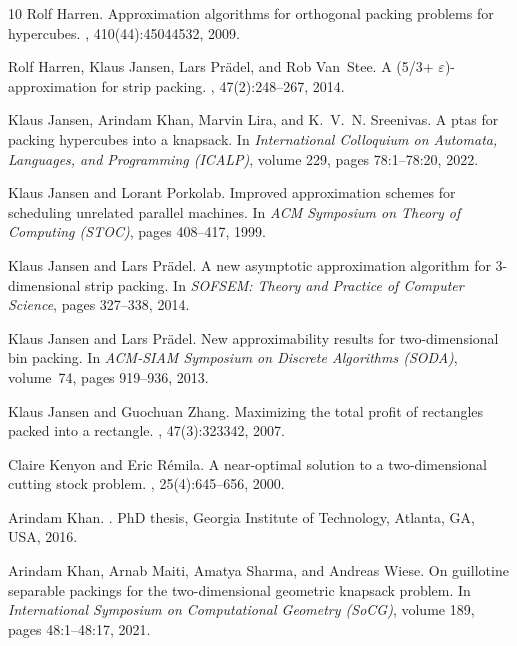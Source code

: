 \begin{thebibliography}{10}
Rolf Harren.
\newblock Approximation algorithms for orthogonal packing problems for
  hypercubes.
, 410(44):4504\textendash{}4532, 2009.

Rolf Harren, Klaus Jansen, Lars Pr{\"a}del, and Rob Van~Stee.
\newblock A (5/3+ $\varepsilon$)-approximation for strip packing.
, 47(2):248--267, 2014.

Klaus Jansen, Arindam Khan, Marvin Lira, and K.~V.~N. Sreenivas.
\newblock A ptas for packing hypercubes into a knapsack.
\newblock In {\em International Colloquium on Automata, Languages, and
  Programming (ICALP)}, volume 229, pages 78:1--78:20, 2022.

Klaus Jansen and Lorant Porkolab.
\newblock Improved approximation schemes for scheduling unrelated parallel
  machines.
\newblock In {\em ACM Symposium on Theory of Computing (STOC)}, pages 408--417,
  1999.

Klaus Jansen and Lars Pr{\"a}del.
\newblock A new asymptotic approximation algorithm for 3-dimensional strip
  packing.
\newblock In {\em SOFSEM: Theory and Practice of Computer Science}, pages
  327--338, 2014.

Klaus Jansen and Lars Prädel.
\newblock New approximability results for two-dimensional bin packing.
\newblock In {\em ACM-SIAM Symposium on Discrete Algorithms (SODA)}, volume~74,
  pages 919--936, 2013.

Klaus Jansen and Guochuan Zhang.
\newblock Maximizing the total profit of rectangles packed into a rectangle.
, 47(3):323\textendash{}342, 2007.

Claire Kenyon and Eric R{\'{e}}mila.
\newblock A near-optimal solution to a two-dimensional cutting stock problem.
, 25(4):645--656, 2000.

Arindam Khan.
.
\newblock PhD thesis, Georgia Institute of Technology, Atlanta, GA, {USA},
  2016.

Arindam Khan, Arnab Maiti, Amatya Sharma, and Andreas Wiese.
\newblock On guillotine separable packings for the two-dimensional geometric
  knapsack problem.
\newblock In {\em International Symposium on Computational Geometry (SoCG)},
  volume 189, pages 48:1--48:17, 2021.


\end{thebibliography}
